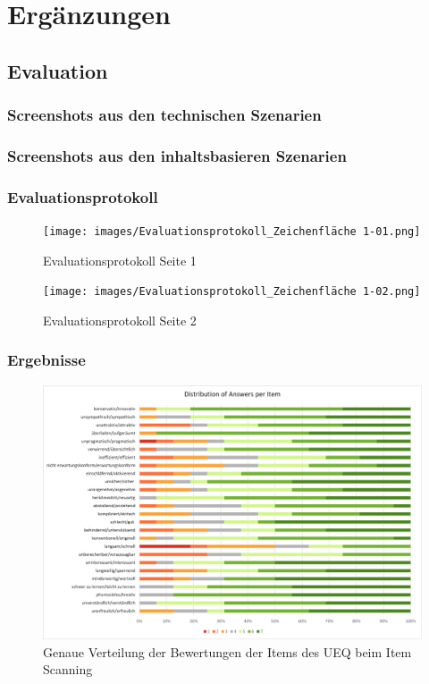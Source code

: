 \chapter{Ergänzungen}

\section{Evaluation}

\subsection{Screenshots aus den technischen Szenarien}
\label{Anhang:screenTechnisch}

\subsection{Screenshots aus den inhaltsbasieren Szenarien}
\label{Anhang:screenInhalt}

\subsection{Evaluationsprotokoll}
\label{Anhang:protokoll}
\begin{figure}[tbh]
    \centering
    \texttt{[image: images/Evaluationsprotokoll\_Zeichenfläche 1-01.png]}
    \caption{Evaluationsprotokoll Seite 1}
    \label{fig:protokoll1}
\end{figure}

\begin{figure}[tbh]
    \centering
    \texttt{[image: images/Evaluationsprotokoll\_Zeichenfläche 1-02.png]}
    \caption{Evaluationsprotokoll Seite 2}
    \label{fig:protokoll2}
\end{figure}

\subsection{Ergebnisse}
\label{Anhang:Ergebnisse}

\begin{figure}[tbh]
    \centering
    \includegraphics[scale=0.75]{images/Results/UEQ-VerteilungDerItems-ItemScanning.png}
    \caption{Genaue Verteilung der Bewertungen der Items des UEQ beim Item Scanning}
    \label{fig:ueqItemVerteilungItem}
\end{figure}

